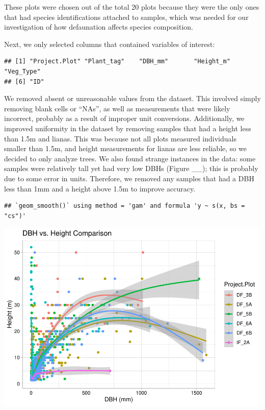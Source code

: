 \documentclass[
  12pt,
]{article}
\begin{document}
These plots were chosen out of the total 20 plots because they were the
only ones that had species identifications attached to samples, which
was needed for our investigation of how defaunation affects species
composition.

Next, we only selected columns that contained variables of interest:

\begin{verbatim}
## [1] "Project.Plot" "Plant_tag"    "DBH_mm"       "Height_m"     "Veg_Type"    
## [6] "ID"
\end{verbatim}

We removed absent or unreasonable values from the dataset. This involved
simply removing blank cells or ``NAs'', as well as measurements that
were likely incorrect, probably as a result of improper unit
conversions. Additionally, we improved uniformity in the dataset by
removing samples that had a height less than 1.5m and lianas. This was
because not all plots measured individuals smaller than 1.5m, and height
measurements for lianas are less reliable, so we decided to only analyze
trees. We also found strange instances in the data: some samples were
relatively tall yet had very low DBHs (Figure \_\_); this is probably
due to some error in units. Therefore, we removed any samples that had a
DBH less than 1mm and a height above 1.5m to improve accuracy.

\begin{verbatim}
## `geom_smooth()` using method = 'gam' and formula 'y ~ s(x, bs = "cs")'
\end{verbatim}

\includegraphics{GoldenGriffithsKnierMalinowski_ENV872_Project_files/figure-latex/plot of DBH vs height-1.pdf}
\end{document}
